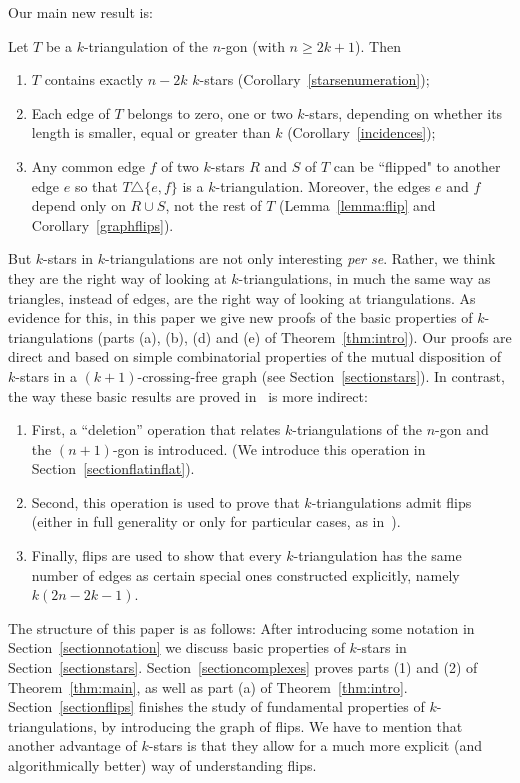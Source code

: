 \documentclass[12pt]{amsart}
\begin{document}
Our main new result is:
\begin{theorem}
\label{thm:main}
Let $T$ be a $k$-triangulation of the $n$-gon (with $n\ge 2k+1$). Then
\begin{enumerate}
\item $T$ contains exactly $n-2k$ $k$-stars (Corollary~\ref{starsenumeration});
\item Each edge of $T$ belongs to zero, one or two $k$-stars, depending on whether its length is smaller, equal or greater than $k$ (Corollary~\ref{incidences});
\item Any common edge $f$ of two $k$-stars $R$ and $S$ of $T$ can be ``flipped" to another edge $e$ so that $T\triangle\{e,f\}$ is a $k$-triangulation. Moreover, the edges $e$ and $f$ depend only on $R\cup S$, not the rest of $T$ (Lemma~\ref{lemma:flip} and Corollary~\ref{graphflips}).
\end{enumerate}
\end{theorem}

But $k$-stars in $k$-triangulations are not only interesting {\it per se}. Rather, we think they are the right way of looking at $k$-triangulations, in much the same way as triangles, instead of edges, are the right way of looking at triangulations. As evidence for this, in this paper we give new proofs of the basic properties of $k$-triangulations (parts (a), (b), (d) and (e) of Theorem~\ref{thm:intro}). Our proofs are direct and based on simple combinatorial properties of the mutual disposition of $k$-stars in a $(k+1)$-crossing-free graph (see Section~\ref{sectionstars}). In contrast, the way these basic results are proved in~\cite{dkm-lahp-02,j-gt-03,j-gtdfssp-05,n-gdfcp-00} is more indirect:

\begin{enumerate}
\item First, a ``deletion'' operation that relates $k$-triangulations of the $n$-gon and the $(n+1)$-gon is introduced. (We introduce this operation in Section~\ref{sectionflatinflat}).
\item Second, this operation is used to prove that $k$-triangulations admit flips (either in full generality or only for particular cases, as in~\cite{dkm-lahp-02}).
\item Finally, flips are used to show that every $k$-triangulation has the same number of edges as certain special ones constructed explicitly, namely $k(2n-2k-1)$.
\end{enumerate}

The structure of this paper is as follows: After introducing some notation in Section~\ref{sectionnotation} we discuss basic properties of $k$-stars in Section~\ref{sectionstars}. Section~\ref{sectioncomplexes} proves parts (1) and (2) of Theorem~\ref{thm:main}, as well as part (a) of Theorem~\ref{thm:intro}. Section~\ref{sectionflips} finishes the study of fundamental properties of $k$-triangulations, by introducing the graph of flips. We have to mention that another advantage of $k$-stars is that they allow for a much more explicit (and algorithmically better) way of understanding flips.
\end{document}
